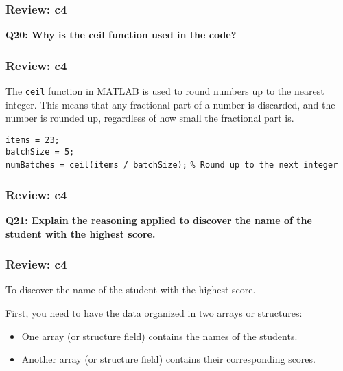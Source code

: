 \documentclass[
	11pt, %
]{beamer}
\begin{document}
\begin{frame}
	\frametitle{Review: c4}

	\textbf{Q20: Why is the ceil function used in the code?}

\end{frame}


\begin{frame}
	\frametitle{Review: c4}

    The \texttt{ceil} function in MATLAB is used to round numbers up to the nearest integer. This means that any fractional part of a number is discarded, and the number is rounded up, regardless of how small the fractional part is.

    \texttt{items = 23;} \\
    \texttt{batchSize = 5;} \\
    \texttt{numBatches = ceil(items / batchSize);} \texttt{\% Round up to the next integer}

\end{frame}

\begin{frame}
	\frametitle{Review: c4}

	\textbf{Q21: Explain the reasoning applied to discover the name of the student with the highest score.}

\end{frame}


\begin{frame}
	\frametitle{Review: c4}

	To discover the name of the student with the highest score.

    First, you need to have the data organized in two arrays or structures:
    \begin{itemize}
        \item One array (or structure field) contains the names of the students.
        \item Another array (or structure field) contains their corresponding scores.
    \end{itemize}
    
\end{frame}

\end{document}
